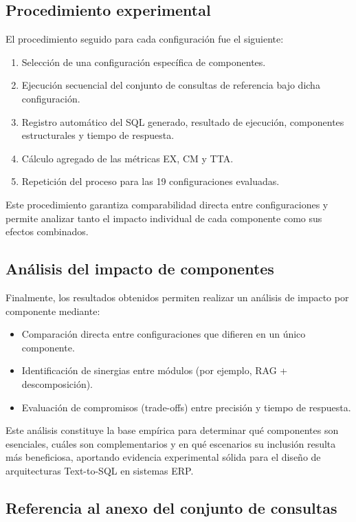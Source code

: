 \documentclass[journal]{IEEEtran}
\begin{document}
\subsection{Procedimiento experimental}

El procedimiento seguido para cada configuración fue el siguiente:

\begin{enumerate}
	\item Selección de una configuración específica de componentes.
	\item Ejecución secuencial del conjunto de consultas de referencia bajo dicha configuración.
	\item Registro automático del SQL generado, resultado de ejecución, componentes estructurales y tiempo de respuesta.
	\item Cálculo agregado de las métricas EX, CM y TTA.
	\item Repetición del proceso para las 19 configuraciones evaluadas.
\end{enumerate}

Este procedimiento garantiza comparabilidad directa entre configuraciones y permite analizar tanto el impacto individual de cada componente como sus efectos combinados.

\subsection{Análisis del impacto de componentes}

Finalmente, los resultados obtenidos permiten realizar un análisis de impacto por componente mediante:

\begin{itemize}
	\item Comparación directa entre configuraciones que difieren en un único componente.
	\item Identificación de sinergias entre módulos (por ejemplo, RAG + descomposición).
	\item Evaluación de compromisos (trade-offs) entre precisión y tiempo de respuesta.
\end{itemize}

Este análisis constituye la base empírica para determinar qué componentes son esenciales, cuáles son complementarios y en qué escenarios su inclusión resulta más beneficiosa, aportando evidencia experimental sólida para el diseño de arquitecturas Text-to-SQL en sistemas ERP.

\subsection{Referencia al anexo del conjunto de consultas}
\end{document}
